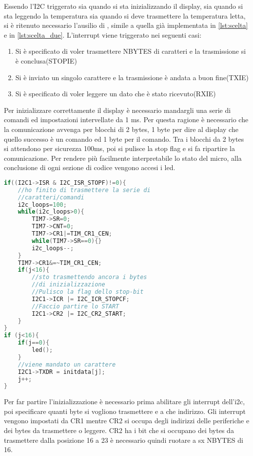 \documentclass[main.tex]{subfiles}
\begin{document}
Essendo l'I2C triggerato sia quando si sta inizializzando il display, sia quando si sta leggendo la temperatura sia quando si deve trasmettere la temperatura letta, si è ritenuto necessario l'ausilio di , simile a quella già implementata in \ref{lst:scelta} e in \ref{lst:scelta_due}.
L'interrupt viene triggerato nei seguenti casi:\begin{enumerate}
    \item Si è specificato di voler trasmettere NBYTES di caratteri e la trasmissione si è conclusa(STOPIE)
    \item Si è inviato un singolo carattere e la trasmissione è andata a buon fine(TXIE)
    \item Si è specificato di voler leggere un dato che è stato ricevuto(RXIE)
\end{enumerate}
Per inizializzare correttamente il display è necessario mandargli una serie di comandi ed impostazioni intervellate da 1 ms. Per questa ragione è necessario che la comunicazione avvenga per blocchi di 2 bytes, 1 byte per dire al display che quello successo è un comando ed 1 byte per il comando. Tra i blocchi da 2 bytes si attendono per sicurezza 100ms, poi si pulisce la stop flag e si fa ripartire la comunicazione. 
Per rendere più facilmente interpretabile lo stato del micro, alla conclusione di ogni sezione di codice vengono accesi i led.
\begin{lstlisting}[language=C, caption=Gestione Interrupt I2C per inizializzazione Display]
if((I2C1->ISR & I2C_ISR_STOPF)!=0){
    //ho finito di trasmettere la serie di 
    //caratteri/comandi
	i2c_loops=100;
	while(i2c_loops>0){
		TIM7->SR=0;
		TIM7->CNT=0;
		TIM7->CR1|=TIM_CR1_CEN;
		while(TIM7->SR==0){}
		i2c_loops--;
	}
	TIM7->CR1&=~TIM_CR1_CEN;
	if(j<16){
	    //sto trasmettendo ancora i bytes 
	    //di inizializzazione
	    //Pulisco la flag dello stop-bit
		I2C1->ICR |= I2C_ICR_STOPCF;
		//Faccio partire lo START
		I2C1->CR2 |= I2C_CR2_START; 
	}
}
if (j<16){
	if(j==0){
		led();
	}
	//viene mandato un carattere
	I2C1->TXDR = initdata[j];
	j++; 
}
\end{lstlisting}
Per far partire l'inizializzazione è necessario prima abilitare gli interrupt dell'i2c, poi specificare quanti byte si vogliono trasmettere e a che indirizzo. 
Gli interrupt vengono impostati da CR1 mentre CR2 si occupa degli indirizzi delle periferiche e dei bytes da trasmettere o leggere. CR2 ha i bit che si occupano dei bytes da trasmettere dalla posizione 16 a 23 è necessario quindi ruotare a sx NBYTES di 16. 
\end{document}
